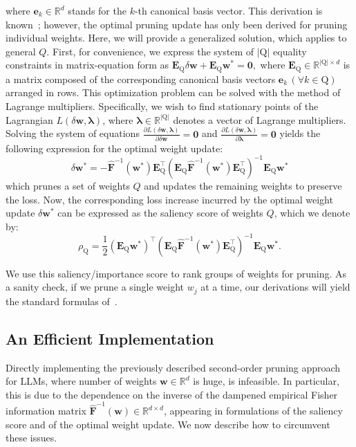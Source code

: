 \documentclass[11pt]{article}
\newcommand{\vect}[1]{\mathbf{#1}}
\newcommand{\ws}{\vect{w}^*}
\newcommand{\w}{\mathbf{w}}
\newcommand{\pr}[1]{\left(#1\right)}
\newcommand{\dw}{\delta \w}
\newcommand{\eF}{\widehat{\vect{F}}}
\newcommand{\e}{\vect{e}}
\newcommand{\E}{\vect{E}}
\newcommand{\subQ}{\textrm{Q}}
\begin{document}
\noindent where \( \e_k \in \mathbb{R}^d \) stands for the \( k \)-th canonical basis vector. This derivation is known~\cite{hassibi1993second}; however, the optimal pruning update has only been derived for pruning individual weights. Here, we will provide a generalized solution, which applies to general $Q$. 
First, for convenience, we express the system of \( |\textrm{Q}| \) equality constraints in matrix-equation form as
\(    \E_\subQ \dw + \E_\subQ\ws = \vect{0}, \)
 where \( \E_\subQ \in \mathbb{R}^{|\subQ| \times d} \) is a matrix composed of the corresponding canonical basis vectors \( \e_k\, (\forall k \in \subQ) \) arranged in rows. This optimization problem can be solved with the method of Lagrange multipliers. Specifically, we wish to find stationary points of the Lagrangian \( L(\dw, \boldsymbol{\lambda}) \), where \( \boldsymbol{\lambda} \in \mathbb{R}^{|\subQ|} \) denotes a vector of Lagrange multipliers. Solving the system of equations 
\(
    \frac{\partial L(\dw, \boldsymbol{\lambda})}{\partial \dw} = \vect{0} \) and 
\(    \frac{\partial L(\dw, \boldsymbol{\lambda})}{\partial \boldsymbol{\lambda}} = \vect{0} \)
yields the following expression for the optimal weight update:
\begin{equation*}
\label{eq:update}
    \dw^* = -\eF^{-1}(\ws) \E_\subQ^\top \pr{\E_\subQ \eF^{-1}(\ws) \E_\subQ^\top}^{-1} \E_\subQ \ws 
\end{equation*}
which prunes a set of weights $Q$ and updates the remaining weights to preserve the loss.
Now, the corresponding loss increase incurred by the optimal weight update \( \dw^* \) can be expressed as the saliency score of weights $Q$, which we denote by:
\begin{equation*}
\label{eq:saliency}
    \rho_\subQ = \frac{1}{2} \pr{\E_\subQ \w^*}^\top \pr{\E_\subQ \eF^{-1}(\ws)\E_\subQ^\top}^{-1} \E_\subQ \w^*.
\end{equation*}

We use this saliency/importance score to rank groups of weights for pruning. As a sanity check, if we prune a single weight $w_j$ at a time, our derivations will yield the standard formulas of~\cite{hassibi1993second, Singh2020WoodFisherES}.

\subsection{An Efficient Implementation}

Directly implementing the previously described second-order pruning approach for LLMs, where number of weights $\w \in \mathbb{R}^d$ is huge, is infeasible. In particular, this is due to the dependence on the inverse of the dampened empirical Fisher information matrix $\eF^{-1}(\w) \in \mathbb{R}^{d \times d}$, appearing in formulations of the saliency score and of the optimal weight update. 
We now describe how to circumvent these issues. 
\end{document}
